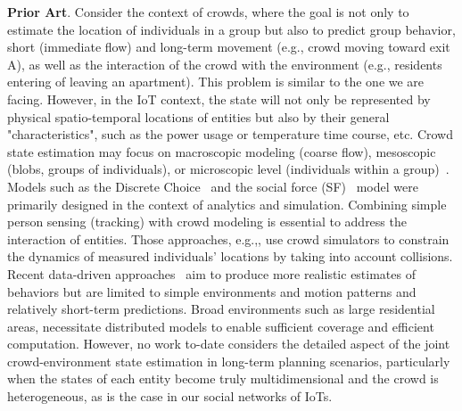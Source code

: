 {\bf Prior Art}.  Consider the context of crowds, where the goal is not only to estimate the location of individuals in a group but also to predict group behavior, short (immediate flow) and long-term movement (e.g., crowd moving toward exit A), as well as the interaction of the crowd with the environment (e.g., residents entering of leaving an apartment).  This problem is similar to the one we are facing. However, in the IoT context, the state will not only be represented by physical spatio-temporal locations of entities but also by their general "characteristics", such as the power usage or temperature time course, etc.  Crowd state estimation may focus on macroscopic modeling (coarse flow), mesoscopic (blobs, groups of individuals), or microscopic level (individuals within a group)~\cite{zhan2008}.  Models such as the Discrete Choice~\cite{antonini2006} and the social force (SF)~\cite{helbing2005, pellegrini2009you} model were primarily designed in the context of analytics and simulation. Combining simple person sensing (tracking) with crowd modeling is essential to address the interaction of entities.  Those approaches, e.g.,\cite{bera2014,bera2015,6907095}, use crowd simulators to constrain the dynamics of measured individuals' locations by taking into account collisions.  Recent data-driven approaches~\cite{zhou2012,wang2013} aim to produce more realistic estimates of behaviors but are limited to simple environments and motion patterns and relatively short-term predictions.  Broad environments such as large residential areas, necessitate distributed models to enable sufficient coverage and efficient computation. However, no work to-date considers the detailed aspect of the joint crowd-environment state estimation in long-term planning scenarios, particularly when the states of each entity become truly multidimensional and the crowd is heterogeneous, as is the case in our social networks of IoTs.


